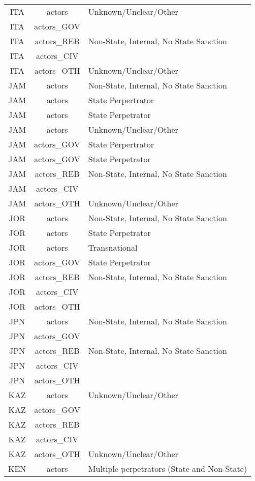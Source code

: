 \documentclass[12pt]{article}
\begin{document}
\begin{center}
\begin{longtable}{|c|c|p{10cm}|}
  ITA & actors & Unknown/Unclear/Other \\ 
  ITA & actors\_GOV &  \\ 
  ITA & actors\_REB & Non-State, Internal, No State Sanction \\ 
  ITA & actors\_CIV &  \\ 
  ITA & actors\_OTH & Unknown/Unclear/Other \\ 
  JAM & actors & Non-State, Internal, No State Sanction \\ 
  JAM & actors & State Perpertrator \\ 
  JAM & actors & State Perpetrator \\ 
  JAM & actors & Unknown/Unclear/Other \\ 
  JAM & actors\_GOV & State Perpertrator \\ 
  JAM & actors\_GOV & State Perpetrator \\ 
  JAM & actors\_REB & Non-State, Internal, No State Sanction \\ 
  JAM & actors\_CIV &  \\ 
  JAM & actors\_OTH & Unknown/Unclear/Other \\ 
  JOR & actors & Non-State, Internal, No State Sanction \\ 
  JOR & actors & State Perpetrator \\ 
  JOR & actors & Transnational \\ 
  JOR & actors\_GOV & State Perpetrator \\ 
  JOR & actors\_REB & Non-State, Internal, No State Sanction \\ 
  JOR & actors\_CIV &  \\ 
  JOR & actors\_OTH &  \\ 
  JPN & actors & Non-State, Internal, No State Sanction \\ 
  JPN & actors\_GOV &  \\ 
  JPN & actors\_REB & Non-State, Internal, No State Sanction \\ 
  JPN & actors\_CIV &  \\ 
  JPN & actors\_OTH &  \\ 
  KAZ & actors & Unknown/Unclear/Other \\ 
  KAZ & actors\_GOV &  \\ 
  KAZ & actors\_REB &  \\ 
  KAZ & actors\_CIV &  \\ 
  KAZ & actors\_OTH & Unknown/Unclear/Other \\ 
  KEN & actors & Multiple perpetrators (State and Non-State) \\ 

\end{longtable}
\end{center}
\end{document}
